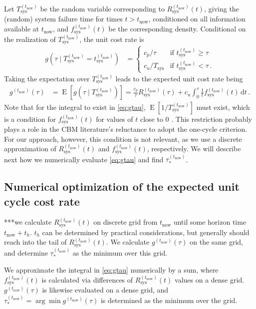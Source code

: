 \documentclass[authoryear]{elsarticle}
\newcommand{\dd}{\,\mathrm{d}}
\newcommand{\Tsys}{T_\text{sys}}
\newcommand{\E}{\operatorname{E}}
\def\tnow{t_\text{now}}
\newcommand{\Rsysnow}{R^{(t_\text{now})}_\text{sys}}
\newcommand{\Tsysnow}{T^{(t_\text{now})}_\text{sys}}
\newcommand{\tsysnow}{t^{(t_\text{now})}_\text{sys}}
\newcommand{\fsysnow}{f^{(t_\text{now})}_\text{sys}}
\newcommand{\gnow}{g^{(\tnow)}}
\newcommand{\tausnow}{\tau_*^{(\tnow)}}
\begin{document}
Let $\Tsysnow$ be the random variable corresponding to $\Rsysnow(t)$,
giving the (random) system failure time for times $t > \tnow$,
conditioned on all information available at $\tnow$,
and $\fsysnow(t)$ be the corresponding density.
Conditional on the realization of $\Tsysnow$, the unit cost rate is 
\begin{align*}
g(\tau \mid \Tsysnow = \tsysnow) &=
\begin{cases}
c_p / \tau  & \text{if } \tsysnow \ge \tau \\
c_u / \Tsys & \text{if } \tsysnow < \tau \,.
\end{cases}
\end{align*}
Taking the expectation over $\Tsysnow$ leads to the expected unit cost rate being
\begin{align}
\gnow(\tau) &= \E[g(\tau \mid \Tsysnow)] = \frac{c_p}{\tau} \Rsysnow(\tau) + c_u \int_0^\tau \frac{1}{t} \fsysnow(t) \dd t\,.
\label{eq:gtau}
\end{align}
Note that for the integral to exist in \eqref{eq:gtau},
$\E[1/\Tsysnow]$ must exist, which is a condition for $\fsysnow(t)$ for values of $t$ close to $0$ \citep{2006:coolen-schrijner-coolen}.
This restriction probably plays a role in the CBM literature's reluctance to adopt the one-cycle criterion.
For our approach, however, this condition is not relevant,
as we use a discrete approximation of $\Rsysnow(t)$ and $\fsysnow(t)$, respectively.
We will describe next how we numerically evaluate \eqref{eq:gtau} and find $\tausnow$.


\subsection{Numerical optimization of the expected unit cycle cost rate}
\label{sec:optim}

***we calculate $\Rsysnow(t)$ on discrete grid from $\tnow$ until some horizon time $\tnow + t_h$.
$t_h$ can be determined by practical considerations,
but generally should reach into the tail of $\Rsysnow(t)$.
We calculate $\gnow(\tau)$ on the same grid,
and determine $\tausnow$ as the minimum over this grid.

We approximate the integral in \eqref{eq:gtau} numerically by a sum,
where $\fsysnow(t)$ is calculated via differences of $\Rsysnow(t)$ values on a dense grid.
$\gnow(\tau)$ is likewise evaluated on a dense grid,
and $\tausnow = \arg\min \gnow(\tau)$ is determined as the minimum over the grid.
\end{document}
